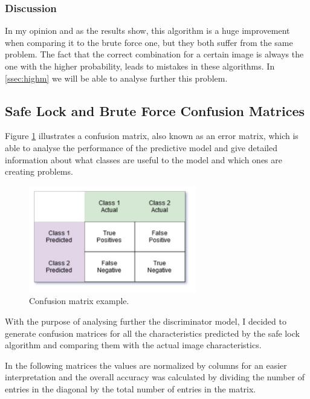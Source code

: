 \documentclass[12pt,a4paper,oneside]{memoir}
\begin{document}
\subsubsection{Discussion}
In my opinion and as the results show, this algorithm is a huge improvement when comparing it to the brute force one, but they both suffer from the same problem. The fact that the correct combination for a certain image is always the one with the higher probability, leads to mistakes in these algorithms. In \autoref{ssec:highm} we will be able to analyse further this problem.


\subsection{Safe Lock and Brute Force Confusion Matrices}
\label{ssec:highm}
 Figure \ref{fig:confexam} illustrates a confusion matrix, also known as an error matrix, which is able to analyse the performance of the predictive model and give detailed information about what classes are useful to the model and which ones are creating problems.
 


\begin{figure}[H]
\centering
\includegraphics[width=0.65\textwidth]{images/confusion_example.jpg}
\caption{Confusion matrix example.}
\centering
\label{fig:confexam}
\end{figure}



With the purpose of analysing further the discriminator model, I decided to generate confusion matrices for all the characteristics predicted by the safe lock algorithm and comparing them with the actual image characteristics. 

\par

In the following matrices the values are normalized by columns for an easier interpretation and the overall accuracy was calculated by dividing the number of entries in the diagonal by the total number of entries in the matrix.
\end{document}
